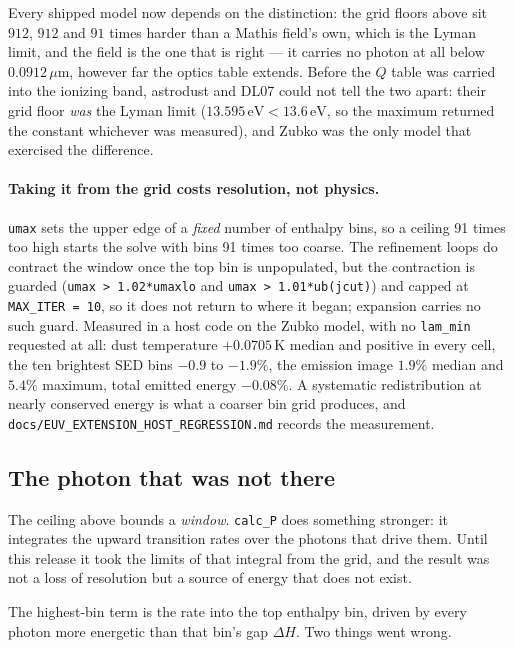 \documentclass{my_memo}
\newcommand{\code}[1]{\texttt{#1}}
\newcommand{\um}{\ensuremath{\,\mu\mathrm{m}}}
\begin{document}
\noindent Every shipped model now depends on the distinction: the grid floors
above sit $912$, $912$ and $91$ times harder than a Mathis field's own, which is
the Lyman limit, and the field is the one that is right --- it carries no photon
at all below $0.0912$\um, however far the optics table extends. Before the $Q$
table was carried into the ionizing band, astrodust and DL07 could not tell the
two apart: their grid floor \emph{was} the Lyman limit
($13.595\,\mathrm{eV} < 13.6\,\mathrm{eV}$, so the maximum returned the constant
whichever was measured), and Zubko was the only model that exercised the
difference.

\paragraph{Taking it from the grid costs resolution, not physics.}
\code{umax} sets the upper edge of a \emph{fixed} number of enthalpy bins, so a
ceiling 91 times too high starts the solve with bins 91 times too coarse. The
refinement loops do contract the window once the top bin is unpopulated, but the
contraction is guarded (\code{umax > 1.02*umaxlo} and
\code{umax > 1.01*ub(jcut)}) and capped at \code{MAX\_ITER = 10}, so it does not
return to where it began; expansion carries no such guard. Measured in a host
code on the Zubko model, with no \code{lam\_min} requested at all: dust
temperature $+0.0705\,$K median and positive in every cell, the ten brightest
SED bins $-0.9$ to $-1.9\%$, the emission image $1.9\%$ median and $5.4\%$
maximum, total emitted energy $-0.08\%$. A systematic redistribution at nearly
conserved energy is what a coarser bin grid produces, and
\code{docs/EUV\_EXTENSION\_HOST\_REGRESSION.md} records the measurement.

\subsection{The photon that was not there}\label{sec:euv-ghost}

The ceiling above bounds a \emph{window}. \code{calc\_P} does something
stronger: it integrates the upward transition rates over the photons that drive
them. Until this release it took the limits of that integral from the grid, and
the result was not a loss of resolution but a source of energy that does not
exist.

The highest-bin term is the rate into the top enthalpy bin, driven by every
photon more energetic than that bin's gap $\Delta H$. Two things went wrong.
\end{document}
